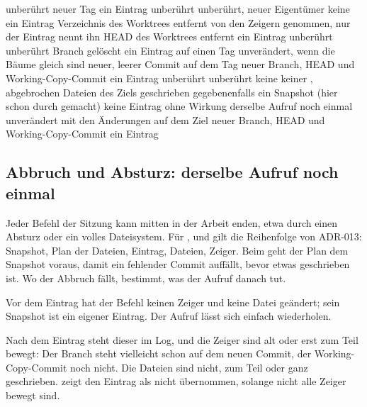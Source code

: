\startxcell unberührt \stopxcell
\startxcell neuer Tag \stopxcell
\startxcell ein Eintrag  \stopxcell
\stopxrow
\startxrow
\startxcell {} \stopxcell
\startxcell unberührt \stopxcell
\startxcell unberührt, neuer Eigentümer \stopxcell
\startxcell keine \stopxcell
\startxcell ein Eintrag  \stopxcell
\stopxrow
\startxrow
\startxcell {} \stopxcell
\startxcell Verzeichnis des Worktrees entfernt \stopxcell
\startxcell von den Zeigern genommen, nur der Eintrag nennt ihn \stopxcell
\startxcell HEAD des Worktrees entfernt \stopxcell
\startxcell ein Eintrag  \stopxcell
\stopxrow
\startxrow
\startxcell {} \stopxcell
\startxcell unberührt \stopxcell
\startxcell unberührt \stopxcell
\startxcell Branch gelöscht \stopxcell
\startxcell ein Eintrag  \stopxcell
\stopxrow
\startxrow
\startxcell {} auf einen Tag \stopxcell
\startxcell unverändert, wenn die Bäume gleich sind \stopxcell
\startxcell neuer, leerer Commit auf dem Tag \stopxcell
\startxcell neuer Branch, HEAD und Working-Copy-Commit \stopxcell
\startxcell ein Eintrag  \stopxcell
\stopxrow
\startxrow
\startxcell {} \stopxcell
\startxcell unberührt \stopxcell
\startxcell unberührt \stopxcell
\startxcell keine \stopxcell
\startxcell keiner \stopxcell
\stopxrow
\startxrow
\startxcell {}, abgebrochen \stopxcell
\startxcell Dateien des Ziels geschrieben \stopxcell
\startxcell gegebenenfalls ein Snapshot (hier schon durch  gemacht) \stopxcell
\startxcell keine \stopxcell
\startxcell Eintrag  ohne Wirkung \stopxcell
\stopxrow
\startxrow
\startxcell derselbe Aufruf noch einmal \stopxcell
\startxcell unverändert \stopxcell
\startxcell mit den Änderungen auf dem Ziel \stopxcell
\startxcell neuer Branch, HEAD und Working-Copy-Commit \stopxcell
\startxcell ein Eintrag  \stopxcell
\stopxrow
\stopxtable
\stopplacetable

\subsection{Abbruch und Absturz: derselbe Aufruf noch einmal}

Jeder Befehl der Sitzung kann mitten in der Arbeit enden, etwa durch einen Absturz oder ein
volles Dateisystem.
Für ,  und  gilt die Reihenfolge von ADR-013: Snapshot, Plan
der Dateien, Eintrag, Dateien, Zeiger.
Beim  geht der Plan dem Snapshot voraus, damit ein fehlender Commit auffällt,
bevor etwas geschrieben ist.
Wo der Abbruch fällt, bestimmt, was der Aufruf danach tut.
\startitemize[n]
\item Vor dem Eintrag hat der Befehl keinen Zeiger und keine Datei geändert; sein Snapshot ist ein
eigener Eintrag. Der Aufruf lässt sich einfach wiederholen.
\item Nach dem Eintrag steht dieser im Log, und die Zeiger sind alt oder erst zum Teil bewegt:
Der Branch steht vielleicht schon auf dem neuen Commit, der Working-Copy-Commit noch nicht.
Die Dateien sind nicht, zum Teil oder ganz geschrieben.  zeigt den Eintrag als nicht
übernommen, solange nicht alle Zeiger bewegt sind.
\stopitemize

